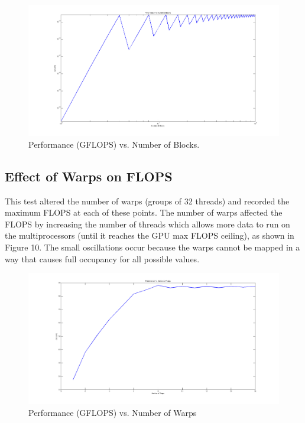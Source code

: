 \documentclass[12pt] {article}
\begin{document}
\begin{figure}[ht!]
	\centering
	\includegraphics[width=5in]{figures/blocks_v_perf.png}
	\caption{Performance (GFLOPS) vs. Number of Blocks.}
\end{figure}
\FloatBarrier

\newpage
\subsection{Effect of Warps on FLOPS}
This test altered the number of warps (groups of 32 threads) and recorded the maximum FLOPS at each of these points. The number of warps affected the FLOPS by increasing the number of threads which allows more data to run on the multiprocessors (until it reaches the GPU max FLOPS ceiling), as shown in Figure 10. The small oscillations occur because the warps cannot be mapped in a way that causes full occupancy for all possible values.

\begin{figure}[ht!]
	\centering
	\includegraphics[width=5in]{figures/warps_v_perf.png}
	\caption{Performance (GFLOPS) vs. Number of Warps}
\end{figure}
\FloatBarrier
\end{document}
